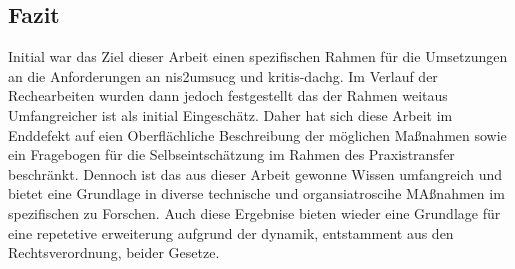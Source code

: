 \documentclass[11pt,a4paper,hidelinks]{article}   %
\begin{document}
        \subsection{Fazit}
        Initial war das Ziel dieser Arbeit einen spezifischen Rahmen für die Umsetzungen an die Anforderungen an \gls{nis2umsucg} und \gls{kritis-dachg}. Im Verlauf der Rechearbeiten wurden dann jedoch festgestellt das der Rahmen weitaus Umfangreicher ist als initial Eingeschätz. Daher hat sich diese Arbeit im Enddefekt auf eien Oberflächliche Beschreibung der möglichen Maßnahmen sowie ein Fragebogen für die Selbseintschätzung im Rahmen des Praxistransfer beschränkt. Dennoch ist das aus dieser Arbeit gewonne Wissen umfangreich und bietet eine Grundlage in diverse technische und organsiatroscihe MAßnahmen im spezifischen zu Forschen. Auch diese Ergebnise bieten wieder eine Grundlage für eine repetetive erweiterung aufgrund der dynamik, entstamment aus den Rechtsverordnung, beider Gesetze.
    \newpage
    \printbibliography
\end{document}
